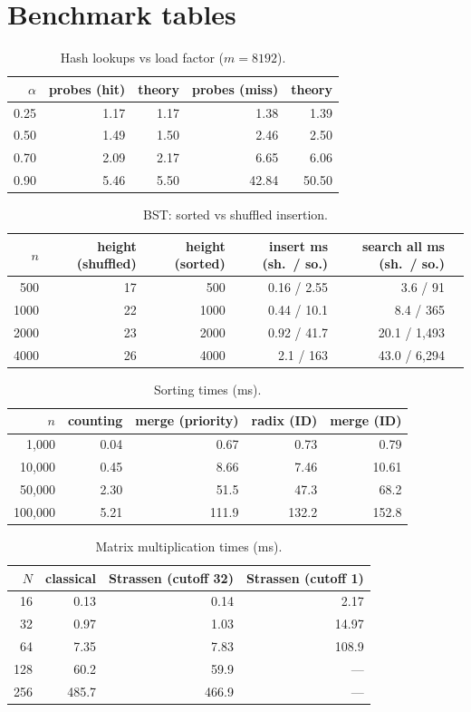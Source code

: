 \documentclass[11pt]{article}
\begin{document}
\section{Benchmark tables}\label{app:bench}
\begin{table}[ht]\centering
\caption{Hash lookups vs load factor ($m = 8192$).}\label{tab:bhash}
\begin{tabular}{@{}rrrrr@{}}
\toprule
$\alpha$ & probes (hit) & theory & probes (miss) & theory \\
\midrule
0.25 & 1.17 & 1.17 & 1.38 & 1.39 \\
0.50 & 1.49 & 1.50 & 2.46 & 2.50 \\
0.70 & 2.09 & 2.17 & 6.65 & 6.06 \\
0.90 & 5.46 & 5.50 & 42.84 & 50.50 \\
\bottomrule
\end{tabular}
\end{table}
\begin{table}[ht]\centering
\caption{BST: sorted vs shuffled insertion.}\label{tab:bbst}
\begin{tabular}{@{}rrrrrr@{}}
\toprule
$n$ & height (shuffled) & height (sorted) & insert ms (sh.\ / so.) & search all ms (sh.\ / so.) \\
\midrule
500 & 17 & 500 & 0.16 / 2.55 & 3.6 / 91 \\
1000 & 22 & 1000 & 0.44 / 10.1 & 8.4 / 365 \\
2000 & 23 & 2000 & 0.92 / 41.7 & 20.1 / 1{,}493 \\
4000 & 26 & 4000 & 2.1 / 163 & 43.0 / 6{,}294 \\
\bottomrule
\end{tabular}
\end{table}
\begin{table}[ht]\centering
\caption{Sorting times (ms).}\label{tab:bsort}
\begin{tabular}{@{}rrrrr@{}}
\toprule
$n$ & counting & merge (priority) & radix (ID) & merge (ID) \\
\midrule
1{,}000 & 0.04 & 0.67 & 0.73 & 0.79 \\
10{,}000 & 0.45 & 8.66 & 7.46 & 10.61 \\
50{,}000 & 2.30 & 51.5 & 47.3 & 68.2 \\
100{,}000 & 5.21 & 111.9 & 132.2 & 152.8 \\
\bottomrule
\end{tabular}
\end{table}
\begin{table}[ht]\centering
\caption{Matrix multiplication times (ms).}\label{tab:bmat}
\begin{tabular}{@{}rrrr@{}}
\toprule
$N$ & classical & Strassen (cutoff 32) & Strassen (cutoff 1) \\
\midrule
16 & 0.13 & 0.14 & 2.17 \\
32 & 0.97 & 1.03 & 14.97 \\
64 & 7.35 & 7.83 & 108.9 \\
128 & 60.2 & 59.9 & --- \\
256 & 485.7 & 466.9 & --- \\
\bottomrule
\end{tabular}
\end{table}
\end{document}
